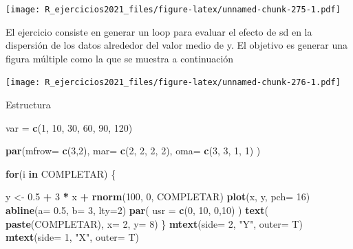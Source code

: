 \documentclass[]{book}
\newenvironment{Shaded}{\begin{snugshade}}{\end{snugshade}}
\newcommand{\ControlFlowTok}[1]{\textcolor[rgb]{0.13,0.29,0.53}{\textbf{#1}}}
\newcommand{\DataTypeTok}[1]{\textcolor[rgb]{0.13,0.29,0.53}{#1}}
\newcommand{\DecValTok}[1]{\textcolor[rgb]{0.00,0.00,0.81}{#1}}
\newcommand{\FloatTok}[1]{\textcolor[rgb]{0.00,0.00,0.81}{#1}}
\newcommand{\KeywordTok}[1]{\textcolor[rgb]{0.13,0.29,0.53}{\textbf{#1}}}
\newcommand{\NormalTok}[1]{#1}
\newcommand{\OperatorTok}[1]{\textcolor[rgb]{0.81,0.36,0.00}{\textbf{#1}}}
\newcommand{\StringTok}[1]{\textcolor[rgb]{0.31,0.60,0.02}{#1}}
\begin{document}
\texttt{[image: R\_ejercicios2021\_files/figure-latex/unnamed-chunk-275-1.pdf]}

El ejercicio consiste en generar un loop para evaluar el efecto de sd en la dispersión de los datos alrededor del valor medio de y. El objetivo es generar una figura múltiple como la que se muestra a continuación

\texttt{[image: R\_ejercicios2021\_files/figure-latex/unnamed-chunk-276-1.pdf]}

Estructura

\begin{Shaded}
\begin{Highlighting}[]
\NormalTok{var =}\StringTok{ }\KeywordTok{c}\NormalTok{(}\DecValTok{1}\NormalTok{, }\DecValTok{10}\NormalTok{, }\DecValTok{30}\NormalTok{, }\DecValTok{60}\NormalTok{, }\DecValTok{90}\NormalTok{, }\DecValTok{120}\NormalTok{)}

\KeywordTok{par}\NormalTok{(}\DataTypeTok{mfrow=} \KeywordTok{c}\NormalTok{(}\DecValTok{3}\NormalTok{,}\DecValTok{2}\NormalTok{), }\DataTypeTok{mar=} \KeywordTok{c}\NormalTok{(}\DecValTok{2}\NormalTok{, }\DecValTok{2}\NormalTok{, }\DecValTok{2}\NormalTok{, }\DecValTok{2}\NormalTok{), }\DataTypeTok{oma=} \KeywordTok{c}\NormalTok{(}\DecValTok{3}\NormalTok{, }\DecValTok{3}\NormalTok{, }\DecValTok{1}\NormalTok{, }\DecValTok{1}\NormalTok{) )}

\ControlFlowTok{for}\NormalTok{(i }\ControlFlowTok{in}\NormalTok{ COMPLETAR) \{}

\NormalTok{  y <-}\StringTok{ }\FloatTok{0.5} \OperatorTok{+}\StringTok{ }\DecValTok{3} \OperatorTok{*}\StringTok{ }\NormalTok{x }\OperatorTok{+}\StringTok{ }\KeywordTok{rnorm}\NormalTok{(}\DecValTok{100}\NormalTok{, }\DecValTok{0}\NormalTok{, COMPLETAR) }
  \KeywordTok{plot}\NormalTok{(x, y, }\DataTypeTok{pch=} \DecValTok{16}\NormalTok{)}
  \KeywordTok{abline}\NormalTok{(}\DataTypeTok{a=} \FloatTok{0.5}\NormalTok{, }\DataTypeTok{b=} \DecValTok{3}\NormalTok{, }\DataTypeTok{lty=}\DecValTok{2}\NormalTok{)}
    \KeywordTok{par}\NormalTok{( }\DataTypeTok{usr =} \KeywordTok{c}\NormalTok{(}\DecValTok{0}\NormalTok{, }\DecValTok{10}\NormalTok{, }\DecValTok{0}\NormalTok{,}\DecValTok{10}\NormalTok{) )}
    \KeywordTok{text}\NormalTok{( }\KeywordTok{paste}\NormalTok{(COMPLETAR), }\DataTypeTok{x=} \DecValTok{2}\NormalTok{, }\DataTypeTok{y=} \DecValTok{8}\NormalTok{)}
\NormalTok{\}}
\KeywordTok{mtext}\NormalTok{(}\DataTypeTok{side=} \DecValTok{2}\NormalTok{, }\StringTok{"Y"}\NormalTok{, }\DataTypeTok{outer=}\NormalTok{ T)}
\KeywordTok{mtext}\NormalTok{(}\DataTypeTok{side=} \DecValTok{1}\NormalTok{, }\StringTok{"X"}\NormalTok{, }\DataTypeTok{outer=}\NormalTok{ T)}
\end{Highlighting}
\end{Shaded}
\end{document}
